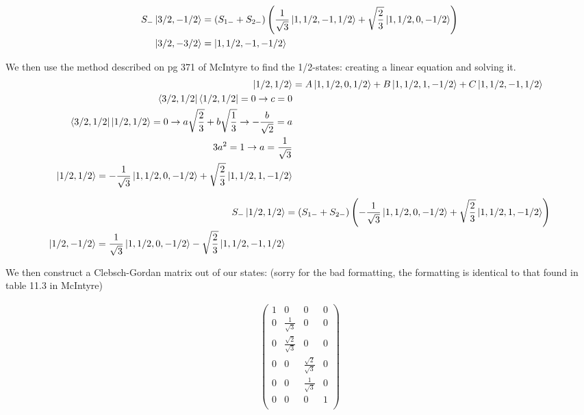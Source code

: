 \documentclass[10pt]{article} %
\begin{document}
\begin{align*}
  S_-\ket{3/2,-1/2} &= \left(S_{1-}+S_{2-}\right)\left(\frac{1}{\sqrt{3}}\ket{1,1/2,-1,1/2} + \sqrt{\frac{2}{3}}\ket{1,1/2,0,-1/2}\right)\\
  \ket{3/2,-3/2} &= \ket{1,1/2,-1,-1/2}\\
\end{align*}

We then use the method described on pg 371 of McIntyre to find the 1/2-states: creating a linear equation and solving it.\\

\begin{align*}
  \ket{1/2,1/2} &= A\ket{1,1/2,0,1/2} + B\ket{1,1/2,1,-1/2} + C\ket{1,1/2,-1,1/2}\\
  \bra{3/2,1/2}\bra{1/2,1/2} = 0 \rightarrow c = 0\\
  \bra{3/2,1/2}\ket{1/2,1/2} = 0 \rightarrow a\sqrt{\frac{2}{3}} + b\sqrt{\frac{1}{3}} \rightarrow -\frac{b}{\sqrt{2}} = a\\
  3a^2 = 1 \rightarrow a = \frac{1}{\sqrt{3}}\\
  \ket{1/2,1/2} = -\frac{1}{\sqrt{3}}\ket{1,1/2,0,-1/2} + \sqrt{\frac{2}{3}}\ket{1,1/2,1,-1/2}\\
\end{align*}

\begin{align*}
  S_-\ket{1/2,1/2} &= \left(S_{1-}+S_{2-}\right)\left(-\frac{1}{\sqrt{3}}\ket{1,1/2,0,-1/2} + \sqrt{\frac{2}{3}}\ket{1,1/2,1,-1/2}\right)\\
  \ket{1/2,-1/2} = \frac{1}{\sqrt{3}}\ket{1,1/2,0,-1/2} - \sqrt{\frac{2}{3}}\ket{1,1/2,-1,1/2}\\
\end{align*}

We then construct a Clebsch-Gordan matrix out of our states: (sorry for the bad formatting,
the formatting is identical to that found in table 11.3 in McIntyre)

\begin{align*}
  \begin{pmatrix}
    1 & 0 & 0 & 0\\
    0 & \frac{1}{\sqrt{3}} & 0 & 0\\
    0 & \frac{\sqrt{2}}{\sqrt{3}} & 0 & 0\\
    0 & 0 & \frac{\sqrt{2}}{\sqrt{3}} & 0\\
    0 & 0 & \frac{1}{\sqrt{3}} & 0\\
    0 & 0 & 0 & 1\\
  \end{pmatrix}
\end{align*}
\end{document}
